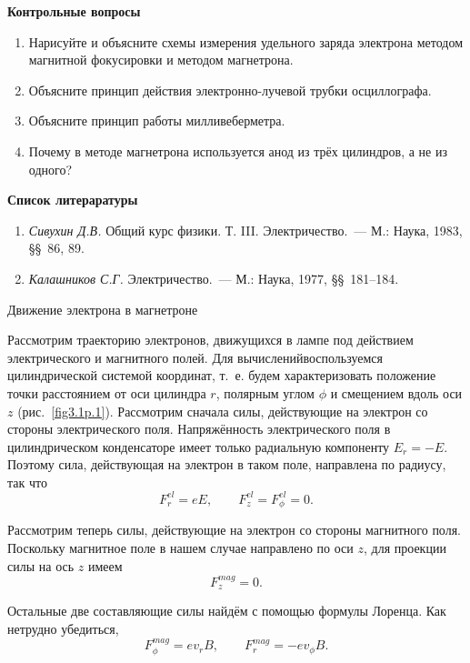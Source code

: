 { \small
{\bf \Large Контрольные вопросы}

\begin{enumerate}
\item{ Нарисуйте и объясните схемы измерения удельного заряда электрона методом магнитной фокусировки и методом магнетрона.}
\item{Объясните принцип действия электронно-лучевой трубки осциллографа.}
\item{ Объясните принцип работы милливеберметра.}
\item{ Почему в методе магнетрона используется анод из трёх цилиндров, а не из одного?}
\end{enumerate}

{\bf \Large Список литераратуры}
\begin{enumerate}
\item{ {\em Сивухин Д.В.} Общий курс физики. Т. III. Электричество.~--- М.: Наука, 1983, \S\S~86, 89.}
\item{ {\em Калашников С.Г.} Электричество.~--- М.: Наука, 1977, \S\S~181--184.}
\end{enumerate}
}



{\LARGE Движение электрона в магнетроне}

Рассмотрим траекторию электронов, движущихся в лампе под действием электрического и магнитного полей. Для вычисленийвоспользуемся цилиндрической системой координат, т.~е. будем характеризовать положение точки расстоянием от оси цилиндра $r$, полярным углом $\phi$ и смещением вдоль оси $z$ (рис.~\ref{fig3.1p.1}). Рассмотрим сначала силы, действующие на электрон со стороны электрического поля. Напряжённость электрического поля в цилиндрическом конденсаторе имеет только радиальную компоненту $E_r=-E$. Поэтому сила, действующая на электрон в таком поле, направлена по радиусу, так что
\begin{equation}
F_r^{el}=eE,\qquad F_z^{el}=F_{\phi}^{el}=0.
\label{eq3.1p.9}
\end{equation}

Рассмотрим теперь силы, действующие на электрон со стороны магнитного поля. Поскольку магнитное поле в нашем случае
направлено по оси $z$, для проекции силы на ось $z$ имеем
\begin{equation}
F_z^{mag}=0.
\label{eq3.1p.10}
\end{equation}

Остальные две составляющие силы найдём с помощью формулы Лоренца. Как нетрудно убедиться,
\begin{equation}
F_{\phi}^{mag}=ev_rB,\qquad F_{r}^{mag}=-ev_{\phi}B.
\label{fig3.1p.11}
\end{equation}

